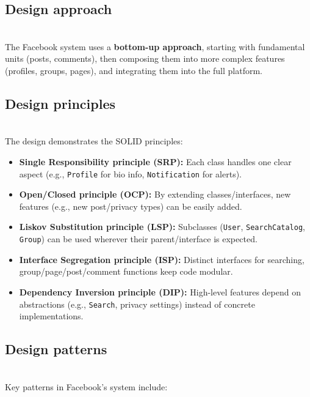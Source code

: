 \subsection{Design approach}\label{M7iG-D1jXA1sz0ERog4MO}
\\
The Facebook system uses a \textbf{bottom-up approach}, starting with fundamental units (posts, comments), then composing them into more complex features (profiles, groups, pages), and integrating them into the full platform.

\subsection{Design principles}\label{nFcGApokayx9dIDZo_E0I}
\\
The design demonstrates the SOLID principles:

\begin{itemize}
\item
\protect{}\label{GI8lO4xLeU0e6e1rMdvyx}
\textbf{Single Responsibility principle (SRP):} Each class handles one clear aspect (e.g., \texttt{Profile} for bio info, \texttt{Notification} for alerts).
\item
\protect{}\label{BEUuEG4xeSbxTSWYri4p4}
\textbf{Open/Closed principle (OCP):} By extending classes/interfaces, new features (e.g., new post/privacy types) can be easily added.
\item
\protect{}\label{9k0Zxzzz4TA76_HlSeghL}
\textbf{Liskov Substitution principle (LSP):} Subclasses (\texttt{User}, \texttt{SearchCatalog}, \texttt{Group}) can be used wherever their parent/interface is expected.
\item
\protect{}\label{l9upWJaS8IWt_ABYiVD_Q}
\textbf{Interface Segregation principle (ISP):} Distinct interfaces for searching, group/page/post/comment functions keep code modular.
\item
\protect{}\label{FG_6YVYgbVyJJKOwRx2H3}
\textbf{Dependency Inversion principle (DIP):} High-level features depend on abstractions (e.g., \texttt{Search}, privacy settings) instead of concrete implementations.
\end{itemize}

\subsection{Design patterns}\label{zWOM1GFToLaZKPJx-4B-2}
\\
Key patterns in Facebook's system include:


